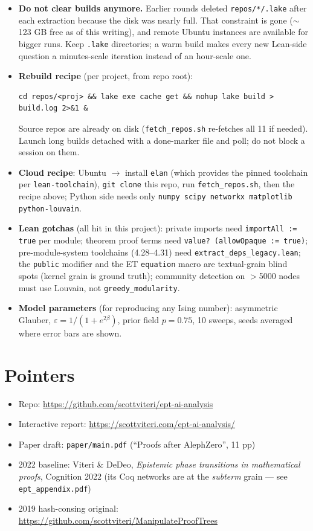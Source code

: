 \documentclass[11pt]{article}
\newcommand{\code}[1]{\texttt{#1}}
\begin{document}
\begin{itemize}[leftmargin=1.4em, itemsep=1pt]
\item \textbf{Do not clear builds anymore.} Earlier rounds deleted \code{repos/*/.lake}
  after each extraction because the disk was nearly full. That constraint is gone
  ($\sim$123 GB free as of this writing), and remote Ubuntu instances are available for
  bigger runs. Keep \code{.lake} directories; a warm build makes every new Lean-side
  question a minutes-scale iteration instead of an hour-scale one.
\item \textbf{Rebuild recipe} (per project, from repo root):
\begin{lstlisting}
cd repos/<proj> && lake exe cache get && nohup lake build > build.log 2>&1 &
\end{lstlisting}
  Source repos are already on disk (\code{fetch\_repos.sh} re-fetches all 11 if needed).
  Launch long builds detached with a done-marker file and poll; do not block a session on
  them.
\item \textbf{Cloud recipe}: Ubuntu $\to$ install \code{elan} (which provides the pinned
  toolchain per \code{lean-toolchain}), \code{git clone} this repo, run
  \code{fetch\_repos.sh}, then the recipe above; Python side needs only
  \code{numpy scipy networkx matplotlib python-louvain}.
\item \textbf{Lean gotchas} (all hit in this project): private imports need
  \code{importAll := true} per module; theorem proof terms need
  \code{value? (allowOpaque := true)}; pre-module-system toolchains (4.28--4.31) need
  \code{extract\_deps\_legacy.lean}; the \code{public} modifier and the ET
  \code{equation} macro are textual-grain blind spots (kernel grain is ground truth);
  community detection on $>$5000 nodes must use Louvain, not
  \code{greedy\_modularity}.
\item \textbf{Model parameters} (for reproducing any Ising number): asymmetric Glauber,
  $\varepsilon = 1/(1+e^{2\beta})$, prior field $p=0.75$, 10 sweeps, seeds averaged where
  error bars are shown.
\end{itemize}

\section{Pointers}
\begin{itemize}[leftmargin=1.4em, itemsep=1pt]
\item Repo: \url{https://github.com/scottviteri/ept-ai-analysis}
\item Interactive report: \url{https://scottviteri.com/ept-ai-analysis/}
\item Paper draft: \code{paper/main.pdf} (``Proofs after AlephZero'', 11 pp)
\item 2022 baseline: Viteri \& DeDeo, \emph{Epistemic phase transitions in mathematical
  proofs}, Cognition 2022 (its Coq networks are at the \emph{subterm} grain --- see
  \code{ept\_appendix.pdf})
\item 2019 hash-consing original: \url{https://github.com/scottviteri/ManipulateProofTrees}
\end{itemize}
\end{document}
